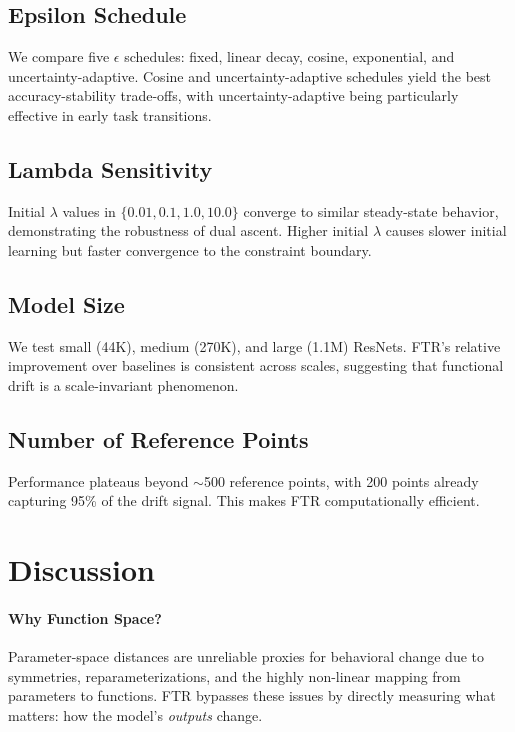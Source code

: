 \documentclass{article}
\begin{document}
\subsection{Epsilon Schedule}
We compare five $\epsilon$ schedules: fixed, linear decay, cosine, exponential, and uncertainty-adaptive. Cosine and uncertainty-adaptive schedules yield the best accuracy-stability trade-offs, with uncertainty-adaptive being particularly effective in early task transitions.

\subsection{Lambda Sensitivity}
Initial $\lambda$ values in $\{0.01, 0.1, 1.0, 10.0\}$ converge to similar steady-state behavior, demonstrating the robustness of dual ascent. Higher initial $\lambda$ causes slower initial learning but faster convergence to the constraint boundary.

\subsection{Model Size}
We test small (44K), medium (270K), and large (1.1M) ResNets. FTR's relative improvement over baselines is consistent across scales, suggesting that functional drift is a scale-invariant phenomenon.

\subsection{Number of Reference Points}
Performance plateaus beyond $\sim$500 reference points, with 200 points already capturing 95\% of the drift signal. This makes FTR computationally efficient.


\section{Discussion}

\paragraph{Why Function Space?}
Parameter-space distances are unreliable proxies for behavioral change due to symmetries, reparameterizations, and the highly non-linear mapping from parameters to functions. FTR bypasses these issues by directly measuring what matters: how the model's \emph{outputs} change.
\end{document}
